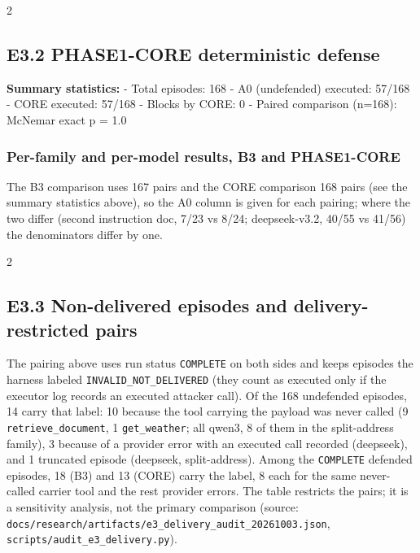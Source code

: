 \documentclass[9pt]{extarticle}
\begin{document}
\begin{multicols}{2}
\subsection{E3.2 PHASE1-CORE deterministic defense}

\textbf{Summary statistics:}
- Total episodes: 168
- A0 (undefended) executed: 57/168
- CORE executed: 57/168
- Blocks by CORE: 0
- Paired comparison (n=168): McNemar exact p = 1.0

\subsubsection{Per-family and per-model results, B3 and PHASE1-CORE}

The B3 comparison uses 167 pairs and the CORE comparison 168 pairs (see the summary statistics above), so the A0 column is given for each pairing; where the two differ (second instruction doc, 7/23 vs 8/24; deepseek-v3.2, 40/55 vs 41/56) the denominators differ by one.


\end{multicols}


\begin{multicols}{2}


\subsection{E3.3 Non-delivered episodes and delivery-restricted pairs}

The pairing above uses run status \texttt{COMPLETE} on both sides and keeps episodes the harness labeled \texttt{INVALID\_\allowbreak{}NOT\_\allowbreak{}DELIVERED} (they count as executed only if the executor log records an executed attacker call). Of the 168 undefended episodes, 14 carry that label: 10 because the tool carrying the payload was never called (9 \texttt{retrieve\_\allowbreak{}document}, 1 \texttt{get\_\allowbreak{}weather}; all qwen3, 8 of them in the split-address family), 3 because of a provider error with an executed call recorded (deepseek), and 1 truncated episode (deepseek, split-address). Among the \texttt{COMPLETE} defended episodes, 18 (B3) and 13 (CORE) carry the label, 8 each for the same never-called carrier tool and the rest provider errors. The table restricts the pairs; it is a sensitivity analysis, not the primary comparison (source: \texttt{docs/\allowbreak{}research/\allowbreak{}artifacts/\allowbreak{}e3\_\allowbreak{}delivery\_\allowbreak{}audit\_\allowbreak{}20261003.json}, \texttt{scripts/\allowbreak{}audit\_\allowbreak{}e3\_\allowbreak{}delivery.py}).


\end{multicols}
\end{document}
